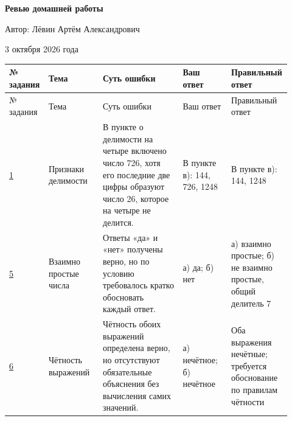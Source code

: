 \documentclass[12pt,a4paper]{article}
\begin{document}
\thispagestyle{empty}
\vspace*{\fill}
\begin{center}
{\LARGE\bfseries Ревью домашней работы\par}
\vspace{1.2cm}
{\large Автор: Лёвин Артём Александрович\par}
\vspace{0.7cm}
{\large 3 октября 2026 года\par}
\end{center}
\vspace*{\fill}
\begin{center}
\end{center}

\newpage

{\small
\setlength{\tabcolsep}{3pt}
\begin{longtable}{>{\raggedright\arraybackslash}p{0.10\linewidth}
                  >{\raggedright\arraybackslash}p{0.19\linewidth}
                  >{\raggedright\arraybackslash}p{0.29\linewidth}
                  >{\raggedright\arraybackslash}p{0.17\linewidth}
                  >{\raggedright\arraybackslash}p{0.17\linewidth}}
\toprule
№ задания & Тема & Суть ошибки & Ваш ответ & Правильный ответ \\
\midrule
\endfirsthead
\toprule
№ задания & Тема & Суть ошибки & Ваш ответ & Правильный ответ \\
\midrule
\endhead

\hyperref[task:1]{1} &
Признаки делимости &
В пункте о делимости на четыре включено число 726, хотя его последние две цифры образуют число 26, которое на четыре не делится. &
В пункте в): 144, 726, 1248 &
В пункте в): 144, 1248 \\
\midrule

\hyperref[task:5]{5} &
Взаимно простые числа &
Ответы «да» и «нет» получены верно, но по условию требовалось кратко обосновать каждый ответ. &
а) да; б) нет &
а) взаимно простые; б) не взаимно простые, общий делитель 7 \\
\midrule

\hyperref[task:6]{6} &
Чётность выражений &
Чётность обоих выражений определена верно, но отсутствуют обязательные объяснения без вычисления самих значений. &
а) нечётное; б) нечётное &
Оба выражения нечётные; требуется обоснование по правилам чётности \\
\bottomrule
\end{longtable}
}
\end{document}

